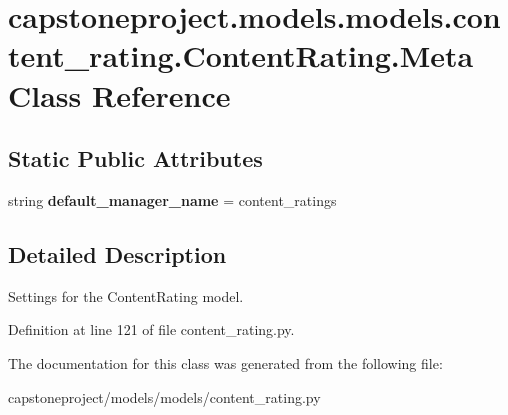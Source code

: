 \hypertarget{classcapstoneproject_1_1models_1_1models_1_1content__rating_1_1_content_rating_1_1_meta}{}\section{capstoneproject.\+models.\+models.\+content\+\_\+rating.\+Content\+Rating.\+Meta Class Reference}
\label{classcapstoneproject_1_1models_1_1models_1_1content__rating_1_1_content_rating_1_1_meta}
\subsection*{Static Public Attributes}
\begin{DoxyCompactItemize}
\item 
\mbox{\label{classcapstoneproject_1_1models_1_1models_1_1content__rating_1_1_content_rating_1_1_meta_ac5dc25199a66f0c187e54f0cac2244e6}} 
string {\bfseries default\+\_\+manager\+\_\+name} = \textquotesingle{}content\+\_\+ratings\textquotesingle{}
\end{DoxyCompactItemize}


\subsection{Detailed Description}
\begin{DoxyVerb}Settings for the ContentRating model.\end{DoxyVerb}
 

Definition at line 121 of file content\+\_\+rating.\+py.



The documentation for this class was generated from the following file\+:\begin{DoxyCompactItemize}
\item 
capstoneproject/models/models/content\+\_\+rating.\+py\end{DoxyCompactItemize}
